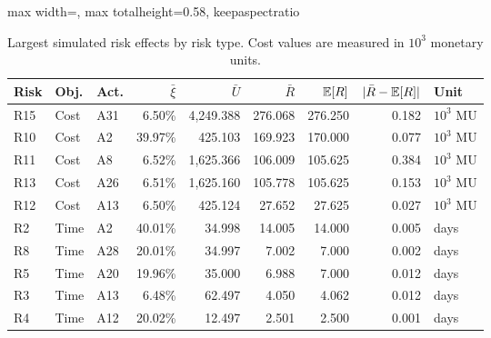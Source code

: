 \begin{table}[H]
\centering
\caption{Largest simulated risk effects by risk type. Cost values are measured in $10^3$ monetary units.}
\label{tab:top-risk-effects}
\scriptsize
\setlength{\tabcolsep}{2.5pt}
\renewcommand{\arraystretch}{0.95}
\begin{adjustbox}{max width=\textwidth, max totalheight=0.58\textheight, keepaspectratio}
\begin{tabular}{@{}lllrrrrrl@{}}
\toprule
Risk & Obj. & Act. & $\bar\xi$ & $\bar U$ & $\bar R$ & $\mathbb{E}[R]$ & $|\bar R-\mathbb{E}[R]|$ & Unit \\
\midrule
R15 & Cost & A31 & 6.50\% & 4,249.388 & 276.068 & 276.250 & 0.182 & $10^3$ MU \\
R10 & Cost & A2 & 39.97\% & 425.103 & 169.923 & 170.000 & 0.077 & $10^3$ MU \\
R11 & Cost & A8 & 6.52\% & 1,625.366 & 106.009 & 105.625 & 0.384 & $10^3$ MU \\
R13 & Cost & A26 & 6.51\% & 1,625.160 & 105.778 & 105.625 & 0.153 & $10^3$ MU \\
R12 & Cost & A13 & 6.50\% & 425.124 & 27.652 & 27.625 & 0.027 & $10^3$ MU \\
R2 & Time & A2 & 40.01\% & 34.998 & 14.005 & 14.000 & 0.005 & days \\
R8 & Time & A28 & 20.01\% & 34.997 & 7.002 & 7.000 & 0.002 & days \\
R5 & Time & A20 & 19.96\% & 35.000 & 6.988 & 7.000 & 0.012 & days \\
R3 & Time & A13 & 6.48\% & 62.497 & 4.050 & 4.062 & 0.012 & days \\
R4 & Time & A12 & 20.02\% & 12.497 & 2.501 & 2.500 & 0.001 & days \\
\bottomrule
\end{tabular}
\end{adjustbox}
\end{table}
